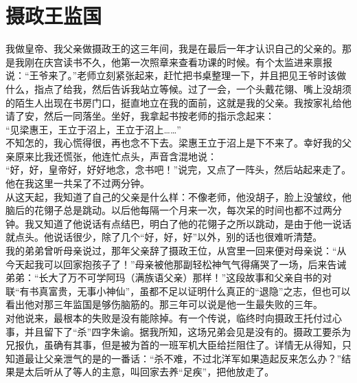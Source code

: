 \fancyhead[RO]{} %
\fancyhead[LE]{} %
\chapter*{摄政王监国}
\thispagestyle{empty}
我做皇帝、我父亲做摄政王的这三年间，我是在最后一年才认识自己的父亲的。那是我刚在庆宫读书不久，他第一次照章来查看功课的时候。有个太监进来禀报说：“王爷来了。”老师立刻紧张起来，赶忙把书桌整理一下，并且把见王爷时该做什么，指点了给我，然后告诉我站立等候。过了一会，一个头戴花翎、嘴上没胡须的陌生人出现在书房门口，挺直地立在我的面前，这就是我的父亲。我按家礼给他请了安，然后一同落坐。坐好，我拿起书按老师的指示念起来：\\

“见梁惠王，王立于沼上，王立于沼上……”\\

不知怎的，我心慌得很，再也念不下去。梁惠王立于沼上是下不来了。幸好我的父亲原来比我还慌张，他连忙点头，声音含混地说：\\

“好，好，皇帝好，好好地念，念书吧！”说完，又点了一阵头，然后站起来走了。他在我这里一共呆了不过两分钟。\\

从这天起，我知道了自己的父亲是什么样：不像老师，他没胡子，脸上没皱纹，他脑后的花翎子总是跳动。以后他每隔一个月来一次，每次呆的时间也都不过两分钟。我又知道了他说话有点结巴，明白了他的花翎子之所以跳动，是由于他一说话就点头。他说话很少，除了几个“好，好，好”以外，别的话也很难听清楚。\\

我的弟弟曾听母亲说过，那年父亲辞了摄政王位，从宫里一回来便对母亲说：“从今天起我可以回家抱孩子了！”母亲被他那副轻松神气气得痛哭了一场，后来告诫弟弟：“长大了万不可学阿玛（满族语父亲）那样！”这段故事和父亲自书的对联“有书真富贵，无事小神仙”，虽都不足以证明什么真正的“退隐”之志，但也可以看出他对那三年监国是够伤脑筋的。那三年可以说是他一生最失败的三年。\\

对他说来，最根本的失败是没有能除掉。有一个传说，临终时向摄政王托付过心事，并且留下了“杀”四字朱谕。据我所知，这场兄弟会见是没有的。摄政工要杀为兄报仇，虽确有其事，但是被为首的一班军机大臣给拦阻住了。详情无从得知，只知道最让父亲泄气的是的一番话：“杀不难，不过北洋军如果造起反来怎么办？”结果是太后听从了等人的主意，叫回家去养“足疾”，把他放走了。\\

